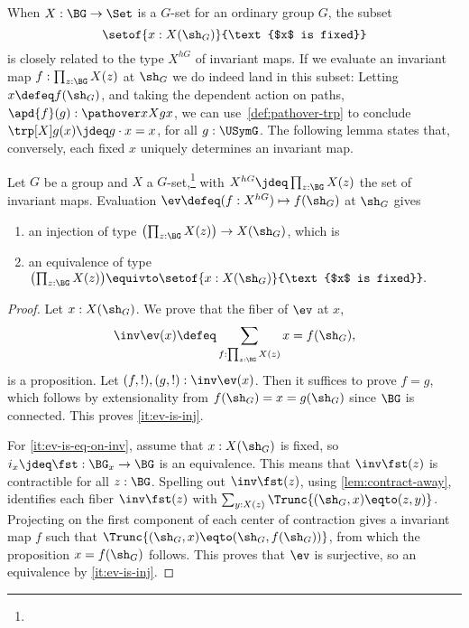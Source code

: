 When $X : \BG \to \Set$ is a $G$-set for an ordinary group $G$, the subset
\[
  \setof{x : X(\sh_G)}{\text{$x$ is fixed}}
\]
is closely related to the type $X^{hG}$ of invariant maps.
If we evaluate an invariant map $f : \prod_{z:\BG}X(z)$ at $\sh_G$
we do indeed land in this subset:
Letting $x\defeq f(\sh_G)$,
and taking the dependent action on paths,
$\apd{f}(g) : \pathover x X g x$,
we can use~\cref{def:pathover-trp} to conclude
$\trp[X] g(x)\jdeq g\cdot x = x$, for all $g:\USymG$.
The following lemma states that, conversely, each fixed $x$ uniquely
determines an invariant map.

\begin{lemma}\label{lem:fixpts-are-fixed}
  Let $G$ be a group and $X$ a $G$-set,\footnote{}
  with $X^{hG} \jdeq \prod_{z:\BG}X(z)$
  the set of invariant maps. 
  Evaluation $\ev\defeq(f:X^{hG})\mapsto f(\sh_G)$ at $\sh_G$ gives
  \begin{enumerate}
  \item\label{it:ev-is-inj} 
  an injection of type $\bigl(\prod_{z:\BG}X(z)\bigr) \to X(\sh_G)$, which is
  \item\label{it:ev-is-eq-on-inv} an equivalence of type 
  $\bigl(\prod_{z:\BG}X(z)\bigr) \equivto
  \setof{x : X(\sh_G)}{\text{$x$ is fixed}}.$
  \end{enumerate}
\end{lemma}
\begin{proof}
  Let $x : X(\sh_G)$. We prove that the fiber of $\ev$ at $x$,
  \[
    \inv\ev(x) \defeq \sum_{f : \prod_{z:\BG}X(z)} x=f(\sh_G),
  \]
  is a proposition. Let $(f,!),(g,!) : \inv\ev(x)$. 
  Then it suffices to prove $f=g$, which follows by extensionality
  from $f(\sh_G)=x=g(\sh_G)$ since $\BG$ is connected. This proves
  \ref{it:ev-is-inj}.
  
  For \ref{it:ev-is-eq-on-inv}, assume that
  $x : X(\sh_G)$ is fixed, so $i_x\jdeq\fst:\BG_x \to \BG$
  is an equivalence. This means that $\inv\fst(z)$ is contractible
  for all $z:\BG$. Spelling out $\inv\fst(z)$, using \cref{lem:contract-away},
  identifies each fiber $\inv\fst(z)$ with
  $\sum_{y:X(z)}\Trunc{(\sh_G,x)\eqto(z,y)}$.
  Projecting on the first component of each center of contraction
  gives a invariant map $f$ such that $\Trunc{(\sh_G,x)\eqto(\sh_G,f(\sh_G))}$,
  from which the proposition $x=f(\sh_G)$ follows. This proves that
  $\ev$ is surjective, so an equivalence by \ref{it:ev-is-inj}.
\end{proof}

